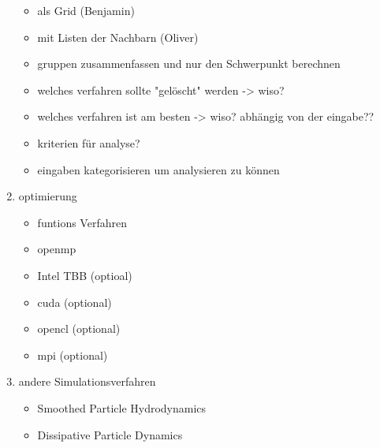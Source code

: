 \documentclass[a4paper]{article}
\begin{document}
\begin{enumerate}
	\begin{itemize}
        \item als Grid (Benjamin)
        \item mit Listen der Nachbarn (Oliver)
        \item gruppen zusammenfassen und nur den Schwerpunkt berechnen
        \item welches verfahren sollte "gelöscht" werden -> wiso?
        \item welches verfahren ist am besten -> wiso? abhängig von der eingabe??
        \item kriterien für analyse?
        \item eingaben kategorisieren um analysieren zu können
    \end{itemize}
\item optimierung
	\begin{itemize}
        \item funtions Verfahren
		\item openmp
        \item Intel TBB (optioal)
        \item cuda (optional) 
        \item opencl (optional)
        \item mpi (optional)
    \end{itemize}
\item andere Simulationsverfahren
	\begin{itemize}
        \item Smoothed Particle Hydrodynamics
        \item Dissipative Particle Dynamics
    \end{itemize}
\end{enumerate}
\end{document}

